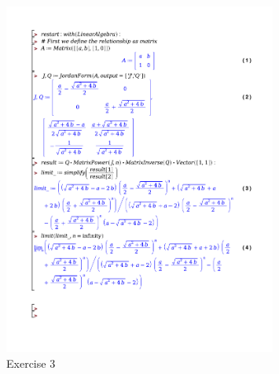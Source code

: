 \documentclass[a4paper]{article}
\begin{document}
\begin{figure}[H]
	\centering
	\includegraphics[width=0.8\textwidth]{exercises/wc_3_ex_3.pdf}
	\caption{Exercise 3}
	\label{fig:wc_3_ex_3}
\end{figure}
\end{document}
